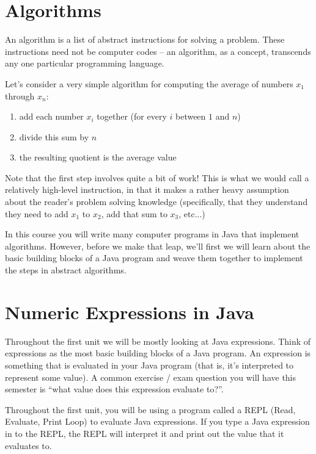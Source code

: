 \section{Algorithms}

An algorithm is a list of abstract instructions for solving a problem. These 
instructions need not be computer codes -- an algorithm, as a concept, transcends 
any one particular programming language. 

\begin{exa}
Let's consider a very simple algorithm for computing the average of numbers $x_{1}$ through $x_{n}$:
\begin{enumerate}
\item add each number $x_{i}$ together (for every $i$ between $1$ and $n$)
\item divide this sum by $n$
\item the resulting quotient is the average value
\end{enumerate}

Note that the first step involves quite a bit of work! This is what we would call a 
relatively high-level instruction, in that it makes a rather heavy assumption about 
the reader's problem solving knowledge (specifically, that they understand they need 
to add $x_{1}$ to $x_{2}$, add that sum to $x_{3}$, etc...)

\end{exa}

In this course you will write many computer programs in Java that implement algorithms.
However, before we make that leap, we'll first we will learn about the basic building
blocks of a Java program and weave them together to implement the steps in abstract
algorithms.

\section{Numeric Expressions in Java}

Throughout the first unit we will be mostly looking at Java expressions. Think of 
expressions as the most basic building blocks of a Java program. An expression is 
something that is evaluated in your Java program (that is, it's interpreted to 
represent some value). A common exercise / exam question you will have this semester 
is ``what value does this expression evaluate to?''.

Throughout the first unit, you will be using a program called a REPL (Read, Evaluate,
Print Loop) to evaluate Java expressions. If you type a 
Java expression in to the REPL, the REPL will interpret it and print out the value 
that it evaluates to. 

